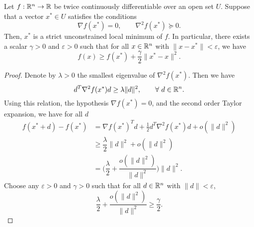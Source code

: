 \documentclass[11pt,a4paper]{article}
\begin{document}
\begin{proposition}
    Let $f:\mathbb{R}^n\rightarrow \mathbb{R}$ be twice continuously differentiable over an open set $U$. Suppose that a vector $x^*\in U$ satisfies the conditions
    \begin{equation*}
        \nabla f(x^*) = 0, \qquad \nabla^2 f(x^*) \succeq 0.
    \end{equation*}
    Then, $x^*$ is a strict unconstrained local minimum of $f$. In particular, there exists a scalar $\gamma>0$ and $\varepsilon>0$ such that for all $x\in \mathbb{R}^n$ with $\|x-x^*\|<\varepsilon$, we have 
    \begin{equation*}
        f(x)\ge f(x^*) + \dfrac{\gamma}{2}\|x^*-x\|^2.
    \end{equation*}
\end{proposition}

\begin{proof}
    Denote by $\lambda>0$ the smallest eigenvalue of $\nabla^2 f(x^*)$. Then we have 
    \begin{equation*}
        d^T \nabla^2 f(x^*) d\ge \lambda \|d\|^2,\qquad \forall\ d\in \mathbb{R}^n.
    \end{equation*}
    Using this relation, the hypothesis $\nabla f(x^*) = 0$, and the second order Taylor expansion, we have for all $d$
    \begin{align*}
        f(x^*+d) -f(x^*) &= \nabla f(x^*)^T d + \frac{1}{2}d^T \nabla^2 f(x^*)d + o(\|d\|^2) \\
        &\ge \dfrac{\lambda}{2}\|d\|^2 + o(\|d\|^2) \\
        &= \bigg(\dfrac{\lambda}{2} + \dfrac{o(\|d\|^2)}{\|d\|^2}\bigg) \|d\|^2.
    \end{align*}
    Choose any $\varepsilon>0$ and $\gamma>0$ such that for all $d\in \mathbb{R}^n$ with $\|d\|<\varepsilon$,
    \begin{equation*}
        \dfrac{\lambda}{2} + \dfrac{o(\|d\|^2)}{\|d\|^2}\ge \dfrac{\gamma}{2}.
    \end{equation*}
\end{proof}


    
    
    
    
\end{document}
